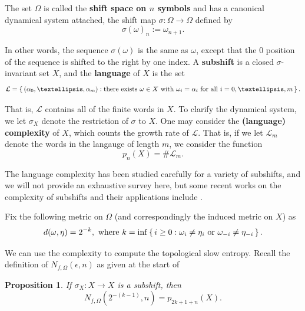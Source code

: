\documentclass[oneside]{amsart}
\theoremstyle{plain}
\newtheorem{PROP}[THM]{Proposition}
\theoremstyle{definition}
\newcommand{\<}{\langle}
\renewcommand{\>}{\rangle}
\newcommand{\ve}{\epsilon}
\renewcommand{\|}{|\!|} %
\begin{document}
The set $\Omega$ is called the {\bf shift space on $n$ symbols} and has a canonical dynamical system attached, the shift map $\sigma : \Omega \to \Omega$ defined by
\begin{equation*}
    \sigma(\omega)_n := \omega_{n+1}.
\end{equation*}


In other words, the sequence $\sigma(\omega)$ is the same as $\omega$, except that the 0 position of the sequence is shifted to the right by one index. A {\bf subshift} is a closed $\sigma$-invariant set $X$, and the {\bf language} of $X$ is the set 
\begin{equation*}
    \mathcal L = \set{ (\alpha_0,\dots,\alpha_m) : \mbox{there exists }\omega \in X \mbox{ with }\omega_i = \alpha_i \mbox{ for all }i=0,\dots,m}.
\end{equation*}

That is, $\mathcal L$ contains all of the finite words in $X$. To clarify the dynamical system, we let $\sigma_X$ denote the restriction of $\sigma$ to $X$. One may consider the {\bf (language) complexity} of $X$, which counts the growth rate of $\mathcal L$. That is, if we let $\mathcal{L}_m$ denote the words in the langauge of length $m$, we consider the function
\begin{equation*}
    p_n(X) = \# \mathcal{L}_m.
\end{equation*}

The language complexity has been studied carefully for a variety of subshifts, and we will not provide an exhaustive survey here, but some recent works on the complexity of subshifts and their applications include \cite{CK20,CJKS22,DOP22,CP23,PS23}. 

Fix the following metric on $\Omega$ (and correspondingly the induced metric on $X$) as
\begin{equation*}
d(\omega,\eta) = 2^{-k}, \mbox{ where } k = \inf\set{i \ge 0 : \omega_i \not= \eta_i \mbox{ or }\omega_{-i} \not= \eta_{-i}}.    
\end{equation*}

We can use the complexity to compute the topological slow entropy. Recall the definition of $N_{f,\Omega}(\ve,n)$ as given at the start of  

\begin{PROP}
\label{prop:complexity}
    If $\sigma_X : X \to X$ is a subshift, then
    \begin{equation*}
        N_{f,\Omega}( 2^{-(k-1)},n) = p_{2k+1+n}(X).
    \end{equation*}
\end{PROP}
\end{document}
